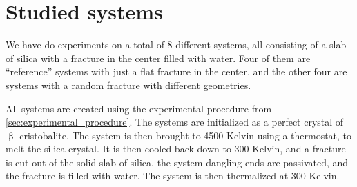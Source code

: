\chapter{Studied systems}
%
%
%
We have do experiments on a total of 8 different systems, all consisting of a slab of silica with a fracture in the center filled with water. Four of them are ``reference'' systems with just a flat fracture in the center, and the other four are systems with a random fracture with different geometries.

All systems are created using the experimental procedure from \cref{sec:experimental_procedure}. The systems are initialized as a perfect crystal of $\upbeta$-cristobalite. The system is then brought to 4500 Kelvin using a thermostat, to melt the silica crystal. It is then cooled back down to 300 Kelvin, and a fracture is cut out of the solid slab of silica, the system dangling ends are passivated, and the fracture is filled with water. The system is then thermalized at 300 Kelvin.

